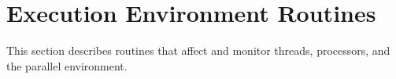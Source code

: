 %
%
%
%
%
%
%
%
%
%
%
%
%


\section{Execution Environment Routines}
\label{sec:Execution Environment Routines}
This section describes routines that affect and monitor threads, processors, and the
parallel environment.






